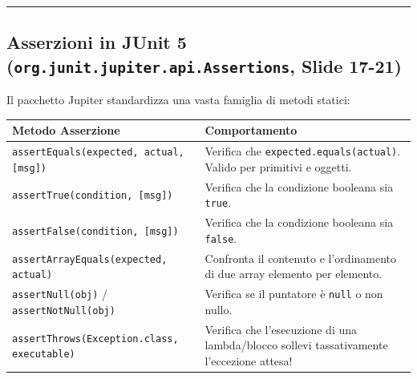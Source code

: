 \documentclass[11pt,a4paper,oneside]{report}
\newcommand{\passthrough}[1]{#1}
\begin{document}
\begin{center}\rule{0.5\linewidth}{0.5pt}\end{center}

\subsection{\texorpdfstring{Asserzioni in JUnit 5
(\texttt{org.junit.jupiter.api.Assertions}, Slide
17-21)}{Asserzioni in JUnit 5 (org.junit.jupiter.api.Assertions, Slide 17-21)}}\label{chap18_asserzioni-in-junit-5-org.junit.jupiter.api.assertions-slide-17-21}

Il pacchetto Jupiter standardizza una vasta famiglia di metodi statici:

\begin{longtable}[]{@{}
  >{\raggedright\arraybackslash}p{}
  >{\raggedright\arraybackslash}p{}@{}}
\toprule\noalign{}
\begin{minipage}[b]{\linewidth}\raggedright
Metodo Asserzione
\end{minipage} & \begin{minipage}[b]{\linewidth}\raggedright
Comportamento
\end{minipage} \\
\midrule\noalign{}
\endhead
\bottomrule\noalign{}
\endlastfoot
\passthrough{\lstinline!assertEquals(expected, actual, [msg])!} &
Verifica che \passthrough{\lstinline!expected.equals(actual)!}. Valido
per primitivi e oggetti. \\
\passthrough{\lstinline!assertTrue(condition, [msg])!} & Verifica che la
condizione booleana sia \passthrough{\lstinline!true!}. \\
\passthrough{\lstinline!assertFalse(condition, [msg])!} & Verifica che
la condizione booleana sia \passthrough{\lstinline!false!}. \\
\passthrough{\lstinline!assertArrayEquals(expected, actual)!} &
Confronta il contenuto e l'ordinamento di due array elemento per
elemento. \\
\passthrough{\lstinline!assertNull(obj)!} /
\passthrough{\lstinline!assertNotNull(obj)!} & Verifica se il puntatore
è \passthrough{\lstinline!null!} o non nullo. \\
\passthrough{\lstinline!assertThrows(Exception.class, executable)!} &
Verifica che l'esecuzione di una lambda/blocco sollevi tassativamente
l'eccezione attesa! \\
\end{longtable}
\end{document}
